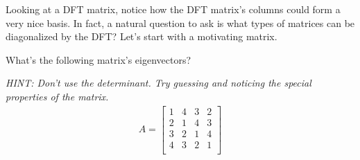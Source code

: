 

Looking at a DFT matrix, notice how the DFT matrix's columns could form a very nice basis.
In fact, a natural question to ask is what types of matrices can be diagonalized by the DFT?
Let's start with a motivating matrix.

\begin{enumerate}

\qitem
What's the following matrix's eigenvectors?

{\em HINT: Don't use the determinant. Try guessing and noticing the special properties of the matrix.}
\begin{align*}
  A = 
\begin{bmatrix}
1 & 4 & 3 & 2 \\
2 & 1 & 4 & 3 \\
3 & 2 & 1 & 4 \\
4 & 3 & 2 & 1 \\
\end{bmatrix}
\end{align*}


\end{enumerate}
